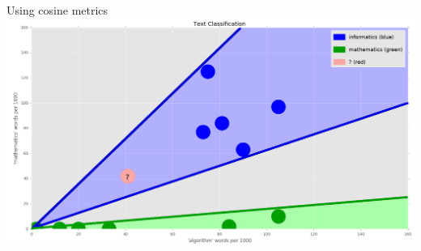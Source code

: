 \documentclass{beamer}
\begin{document}
\begin{frame}{Using cosine metrics}
\includegraphics[width=\textwidth]{images/text2.png}
\end{frame}

\end{document}
